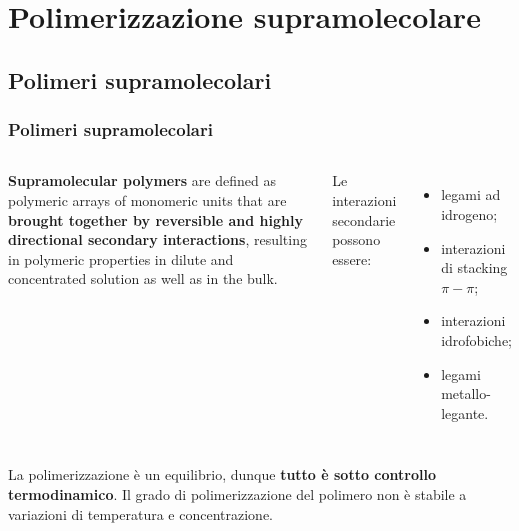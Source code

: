 \section{Polimerizzazione supramolecolare}
\subsection{Polimeri supramolecolari}\begin{frame}\frametitle{Polimeri supramolecolari}
          \vspace{-5pt}  \begin{columns}
   \begin{definition}
              {\bf Supramolecular polymers} are defined as polymeric arrays of monomeric units that are {\bf brought together by reversible and highly directional secondary interactions}, resulting in polymeric properties in dilute and concentrated solution as well as in the bulk. \cite{12}
              \end{definition}
Le interazioni secondarie possono essere:
 \begin{itemize}
  \item legami ad idrogeno;
  \item interazioni di stacking $\pi-\pi$;
  \item interazioni idrofobiche;
  \item legami metallo-legante.
 \end{itemize}\end{columns}\vspace{10pt}
La polimerizzazione è un equilibrio, dunque \textbf{tutto è sotto controllo termodinamico}. Il grado di polimerizzazione del polimero non è stabile a variazioni di temperatura e concentrazione.
\end{frame}




\logo{}

